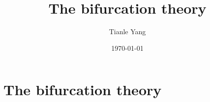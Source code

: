 \documentclass[sectionlevel=section,status=draft]{noteformyself}
\title{The bifurcation theory}
\author{Tianle Yang}
\date{\today}
\begin{document}
    \maketitle

    \section[
      status=draft,
      tag=00000,
      label=\labelNFM{sec:endomorphisms-on-projective-spaces:the-bifurcation-theory}
    ]{The bifurcation theory}

    

    \printbibliography[heading=bibintoc, title={References}]
\end{document}
